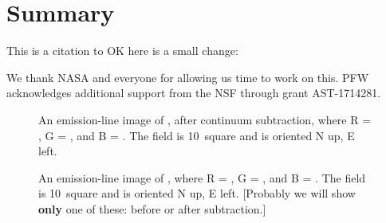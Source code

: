 \section{Summary \label{sec:summary}}

This is a citation to \cite{long14}   OK here is a small change:

\acknowledgments

We thank NASA and everyone for allowing us time to work on this.  PFW acknowledges additional support from the NSF through grant AST-1714281.

\pagebreak





\clearpage





\startlongtable

\clearpage





\pagebreak

\startlongtable



\pagebreak
%

\begin{figure}
\caption{An emission-line image of \gal, after continuum subtraction, where R = \ha, G = \sii, and B = \oiii.  The field is 10\arcmin\ square and is oriented N up, E left. \label{fig_overview} }
\end{figure}

\begin{figure}
\caption{An emission-line image of \gal, where R = \ha, G = \sii, and B = \oiii.  The field is 10\arcmin\ square and is oriented N up, E left.  [Probably we will show {\bf only} one of these: before or after subtraction.] }
\end{figure}

